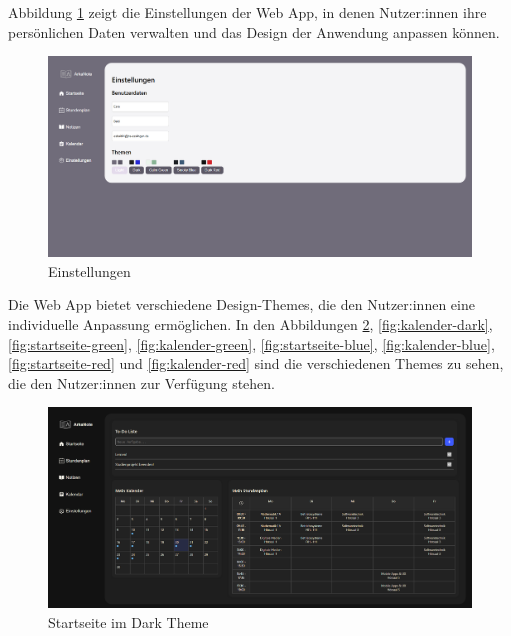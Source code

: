 Abbildung \ref{fig:einstellungen} zeigt die Einstellungen der Web App, in denen Nutzer:innen ihre persönlichen Daten verwalten und das Design der Anwendung anpassen können. \newline
\begin{figure}[H]
  \centering
  \includegraphics[width=1\textwidth]{./images/einstellungen.png}
  \caption{Einstellungen}
  \label{fig:einstellungen}
\end{figure}

Die Web App bietet verschiedene Design-Themes, die den Nutzer:innen eine individuelle Anpassung ermöglichen. In den Abbildungen \ref{fig:startseite-dark}, \ref{fig:kalender-dark}, \ref{fig:startseite-green}, \ref{fig:kalender-green}, \ref{fig:startseite-blue}, \ref{fig:kalender-blue}, \ref{fig:startseite-red} und \ref{fig:kalender-red} sind die verschiedenen Themes zu sehen, die den Nutzer:innen zur Verfügung stehen.\newline
\begin{figure}[H]
  \centering
  \includegraphics[width=1\textwidth]{./images/startseite-dark.png}
  \caption{Startseite im Dark Theme}
  \label{fig:startseite-dark}
\end{figure}

